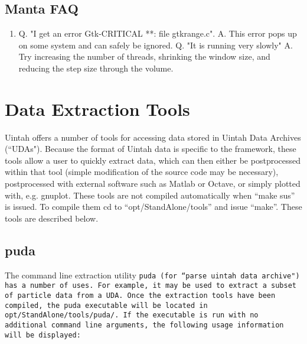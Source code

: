 \section{Manta FAQ}

\begin{enumerate}
\item
Q. "I get an error Gtk-CRITICAL **: file gtkrange.c".
A.  This error pops up on some system and can safely be ignored.
Q.  "It is running very slowly"
A.  Try increasing the number of threads, shrinking the window size, and reducing the step size through the volume.
\end{enumerate}


\chapter{Data Extraction Tools}

Uintah offers a number of tools for accessing data stored in Uintah Data
Archives (``UDAs").  Because the format of Uintah data is specific to the
framework, these tools allow a user to quickly extract data, which can then
either be postprocessed within that tool (simple modification of the source
code may be necessary), postprocessed with external software such as
Matlab or Octave, or simply plotted with, e.g. gnuplot.  These tools are not compiled automatically when ``make sus'' is issued.  To compile them cd to ``opt/StandAlone/tools'' and issue ``make''.  These tools
are described below.

\section{puda}

The command line extraction utility \tt puda \normalfont
(for ``parse uintah data archive") has a number of uses.  For example, it
may be used to extract a subset of particle data from a UDA.  Once the
extraction tools have been compiled, the puda executable will be located in 
\tt opt/StandAlone/tools/puda/. \normalfont  If the executable is run with
no additional command line arguments, the following usage information will be
displayed:

